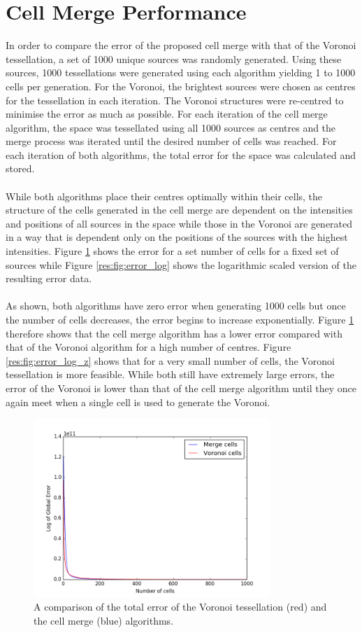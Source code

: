 \section{Cell Merge Performance}
In order to compare the error of the proposed cell merge with that of the Voronoi tessellation, a set of 1000 unique sources was randomly generated. Using these sources, 1000 tessellations were generated using each algorithm yielding 1 to 1000 cells per generation. For the Voronoi, the brightest sources were chosen as centres for the tessellation in each iteration. The Voronoi structures were re-centred to minimise the error as much as possible. For each iteration of the cell merge algorithm, the space was tessellated using all 1000 sources as centres and the merge process was iterated until the desired number of cells was reached. For each iteration of both algorithms, the total error for the space was calculated and stored.
\\
\\
While both algorithms place their centres optimally within their cells, the structure of the cells generated in the cell merge are dependent on the intensities and positions of all sources in the space while those in the Voronoi are generated in a way that is dependent only on the positions of the sources with the highest intensities. Figure \ref{res:fig:error} shows the error for a set number of cells for a fixed set of sources while Figure \ref{res:fig:error_log} shows the logarithmic scaled version of the resulting error data.
\\
\\
As shown, both algorithms have zero error when generating 1000 cells but once the number of cells decreases, the error begins to increase exponentially. Figure \ref{res:fig:error} therefore shows that the cell merge algorithm has a lower error compared with that of the Voronoi algorithm for a high number of centres. Figure \ref{res:fig:error_log_z} shows that for a very small number of cells, the Voronoi tessellation is more feasible. While both still have extremely large errors, the error of the Voronoi is lower than that of the cell merge algorithm until they once again meet when a single cell is used to generate the Voronoi.
\begin{figure}[H]
\centering
\includegraphics[width=0.8\textwidth]{Images/result_error.png}
\caption{A comparison of the total error of the Voronoi tessellation (red) and the cell merge (blue) algorithms.}
\label{res:fig:error}
\end{figure}

